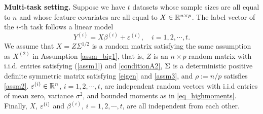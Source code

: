 
\vspace{5pt}
\noindent\textbf{Multi-task setting.} Suppose we have $t$ datasets whose sample sizes are all equal to $n$ and whose feature covariates are all equal to $X \in \mathbb{R}^{n \times p}$. The label vector of the $i$-th task follows a linear model
$$Y^{(i)} = X \beta^{(i)} + \varepsilon^{(i)},\quad i=1,2,\cdots, t.$$
We assume that $X=Z\Sigma^{1/2}$ is a random matrix satisfying the same assumption as $X^{(2)}$ in Assumption \ref{assm_big1}, that is, $Z$ is an $n\times p$ random matrix with i.i.d. entries satisfying (\ref{assm1}) and \eqref{conditionA2}, $\Sigma$ is a deterministic positive definite symmetric matrix satisfying \eqref{eigen} and \eqref{assm3}, and $\rho:=n/p$ satisfies \eqref{assm2}. $\varepsilon^{(i)} \in \mathbb{R}^{n}$, $i=1,2,\cdots, t$, are independent random vectors with i.i.d entries of mean zero, variance $\sigma^2$, and bounded moments as in \eqref{eq_highmoments}. Finally, $X$, ${\varepsilon}^{(i)}$ and $\beta^{(i)}$, $i=1,2,\cdots, t$, are all  independent from each other.

